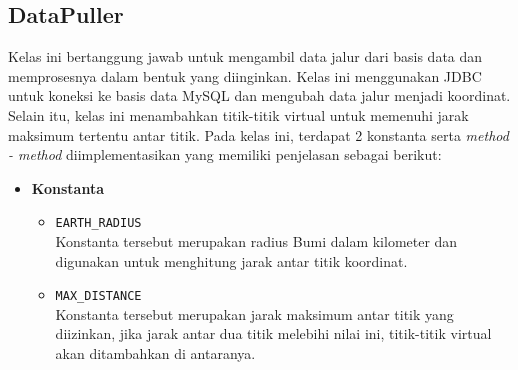 \subsection{DataPuller}
Kelas ini bertanggung jawab untuk mengambil data jalur dari basis data dan memprosesnya dalam bentuk yang diinginkan. Kelas ini menggunakan JDBC untuk koneksi ke basis data MySQL dan mengubah data jalur menjadi koordinat. Selain itu, kelas ini menambahkan titik-titik virtual untuk memenuhi jarak maksimum tertentu antar titik. Pada kelas ini, terdapat 2 konstanta serta \textit{method - method} diimplementasikan yang memiliki penjelasan sebagai berikut:
\begin{itemize}
    \item \textbf{Konstanta}
    \begin{itemize}
        \item \texttt{EARTH\_RADIUS}
        \\ Konstanta tersebut merupakan radius Bumi dalam kilometer dan digunakan untuk menghitung jarak antar titik koordinat.
        \item \texttt{MAX\_DISTANCE}
        \\ Konstanta tersebut merupakan jarak maksimum antar titik yang diizinkan, jika jarak antar dua titik melebihi nilai ini, titik-titik virtual akan ditambahkan di antaranya.
    \end{itemize}


\end{itemize}
